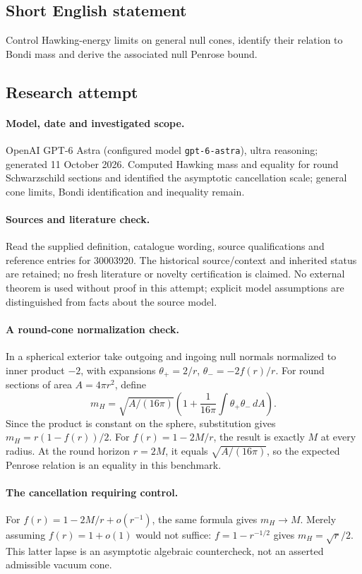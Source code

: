 \documentclass[11pt]{article}
\begin{document}
\subsection{Short English statement}
Control Hawking-energy limits on general null cones, identify their relation to Bondi mass and derive the associated null Penrose bound.
\subsection{Research attempt}
\paragraph{Model, date and investigated scope.}
OpenAI GPT-6 Astra (configured model \texttt{gpt-6-astra}), ultra reasoning; generated 11 October 2026. Computed Hawking mass and equality for round Schwarzschild sections and identified the asymptotic cancellation scale; general cone limits, Bondi identification and inequality remain.

\paragraph{Sources and literature check.}
Read the supplied definition, catalogue wording, source qualifications and reference entries for 30003920. The historical source/context and inherited status are retained; no fresh literature or novelty certification is claimed. No external theorem is used without proof in this attempt; explicit model assumptions are distinguished from facts about the source model.

\paragraph{A round-cone normalization check.} In a spherical exterior take outgoing and ingoing null normals normalized to inner product \(-2\), with expansions \(\theta_+=2/r\), \(\theta_-=-2f(r)/r\). For round sections of area \(A=4\pi r^2\), define
\[
 m_H=\sqrt{A/(16\pi)}\left(1+\frac1{16\pi}\int\theta_+\theta_-\,dA\right).
\]
Since the product is constant on the sphere, substitution gives \(m_H=r(1-f(r))/2\). For \(f(r)=1-2M/r\), the result is exactly \(M\) at every radius. At the round horizon \(r=2M\), it equals \(\sqrt{A/(16\pi)}\), so the expected Penrose relation is an equality in this benchmark.
\paragraph{The cancellation requiring control.} For \(f(r)=1-2M/r+o(r^{-1})\), the same formula gives \(m_H\to M\). Merely assuming \(f(r)=1+o(1)\) would not suffice: \(f=1-r^{-1/2}\) gives \(m_H=\sqrt r/2\). This latter lapse is an asymptotic algebraic countercheck, not an asserted admissible vacuum cone.
\end{document}
